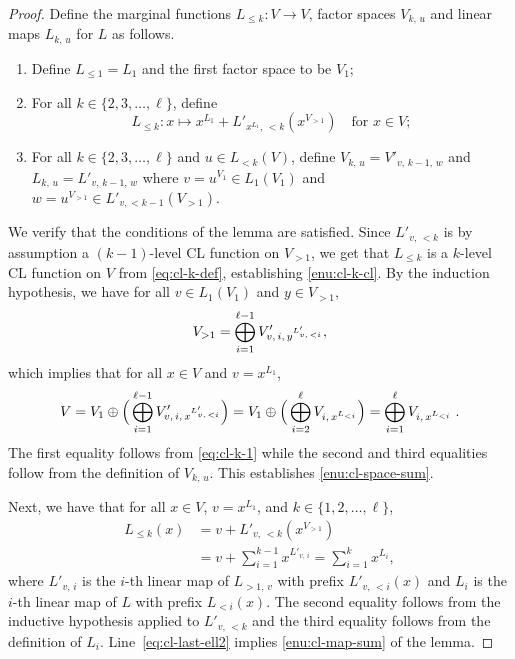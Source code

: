 \begin{proof}
  Define the marginal functions $L_{\le k} : V \to V$, factor spaces
  $V_{k,\, u}$ and linear maps $L_{k,\, u}$ for $L$ as follows.
  \begin{enumerate}[label=(\roman*)]
  \item Define $L_{\le 1} = L_1$ and the first factor space to be $V_1$;
  \item For all $k \in \{2, 3, \ldots, \ell\}$, define
    \begin{equation}
      \label{eq:cl-k-def}
      L_{\le k}: x \mapsto x^{L_1} + L'_{x^{L_1},\, <k} (x^{V_{>1}})
      \quad\text{for } x\in V;
    \end{equation}
	\item For all $k \in \{2, 3, \ldots, \ell\}$ and $u \in L_{< k}(V)$, define
    $V_{k,\, u} = V'_{v,\, k-1,\, w}$ and $L_{k,\, u} = L'_{v,\, k-1,\, w}$
    where $v = u^{V_1} \in L_{1}(V_{1})$ and $w = u^{V_{>1}} \in L'_{v,< k-1}(V_{> 1})$.
  \end{enumerate}
  We verify that the conditions of the lemma are satisfied.
  Since $L'_{v,\, < k}$ is by assumption a $(k-1)$-level CL function on $V_{>
    1}$, we get that $L_{\leq k}$ is a $k$-level CL function on $V$ from
  \cref{eq:cl-k-def}, establishing \cref{enu:cl-k-cl}.
  By the induction hypothesis, we have for all $v\in L_1(V_1)$ and $y \in
  V_{>1}$,
  \begin{equation}
    \label{eq:cl-k-1}
    V_{>1} = \bigoplus_{i=1}^{\ell-1}
    V'_{\smash{v,\, i, \, y^{L'_{v,\, <i}}}},
  \end{equation}
  which implies that for all $x \in V$ and $v = x^{L_1}$,
  \begin{equation*}
    V = V_1 \oplus \Big ( \bigoplus_{i=1}^{\ell-1}
    V'_{\smash{v,\, i, \, x^{L'_{v,\, <i}}}} \Big)
    = V_1 \oplus \Big (\bigoplus_{i=2}^{\ell} V_{i,\, x^{L_{<i}}} \Big)
    = \bigoplus_{i=1}^\ell V_{i,\, x^{L_{<i}}}\;.
  \end{equation*}
  The first equality follows from \cref{eq:cl-k-1} while the second and third
  equalities follow from the definition of $V_{k,\, u}$.
  This establishes \cref{enu:cl-space-sum}.

  Next, we have that for all $x \in V$, $v = x^{L_1}$, and $k \in
  \{1,2,\ldots,\ell\}$,
  \begin{align}
    \label{eq:cl-last-ell}
    L_{\leq k}(x)
    & = v + L'_{v,\, <k} (x^{V_{>1}}) \\
    & = v + \sum_{i=1}^{k-1} x^{L'_{v,\, i}}
    = \sum_{i = 1}^{k} x^{L_{i}}, \label{eq:cl-last-ell2}
  \end{align}
  where $L'_{v,\, i}$ is the $i$-th linear map of $L_{>1,\, v}$ with prefix
  $L'_{v,\, <i}(x)$ and $L_i$ is the $i$-th linear map of $L$ with prefix
  $L_{<i}(x)$.
  The second equality follows from the inductive hypothesis applied to $L'_{v,\,
    <k}$ and the third equality follows from the definition of $L_{i}$.
  Line~\eqref{eq:cl-last-ell2} implies \cref{enu:cl-map-sum} of the lemma.
  

\end{proof}
